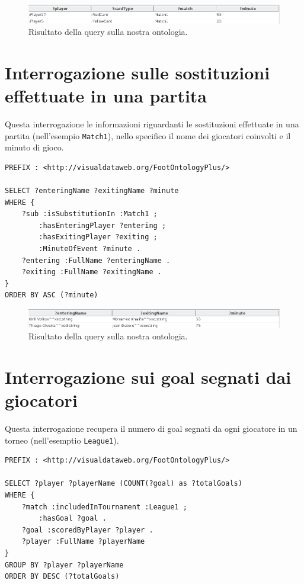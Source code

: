 \documentclass[11pt]{report} %
\begin{document}
\begin{figure}[H]
	\includegraphics[width=\textwidth]{query3}
	\caption{Risultato della query sulla nostra ontologia.}
\end{figure}

\section{Interrogazione sulle sostituzioni effettuate in una partita}

Questa interrogazione le informazioni riguardanti le sostituzioni effettuate in una partita (nell'esempio \texttt{Match1}), nello specifico il nome dei giocatori coinvolti e il minuto di gioco. 

\begin{lstlisting}
PREFIX : <http://visualdataweb.org/FootOntologyPlus/>

SELECT ?enteringName ?exitingName ?minute
WHERE {
    ?sub :isSubstitutionIn :Match1 ;
        :hasEnteringPlayer ?entering ;
        :hasExitingPlayer ?exiting ;
        :MinuteOfEvent ?minute .
    ?entering :FullName ?enteringName .
    ?exiting :FullName ?exitingName .
}
ORDER BY ASC (?minute)
\end{lstlisting}

\begin{figure}[H]
	\includegraphics[width=\textwidth]{query4}
	\caption{Risultato della query sulla nostra ontologia.}
\end{figure}

\section{Interrogazione sui goal segnati dai giocatori}

Questa interrogazione recupera il numero di goal segnati da ogni giocatore in un torneo (nell'esemptio \texttt{League1}).

\begin{lstlisting}
PREFIX : <http://visualdataweb.org/FootOntologyPlus/>

SELECT ?player ?playerName (COUNT(?goal) as ?totalGoals) 
WHERE {
    ?match :includedInTournament :League1 ;
        :hasGoal ?goal .
    ?goal :scoredByPlayer ?player .
    ?player :FullName ?playerName
}
GROUP BY ?player ?playerName
ORDER BY DESC (?totalGoals)
\end{lstlisting}
\end{document}
